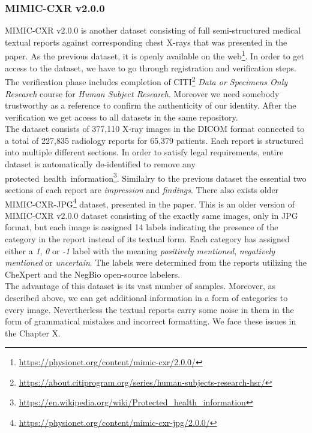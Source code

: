 \subsubsection{MIMIC-CXR v2.0.0}
MIMIC-CXR v2.0.0 is another dataset consisting of full semi-structured medical textual reports against corresponding chest X-rays that was presented in the \citet{cxr:johnson2019mimic} paper. As the previous dataset, it is openly available on the web\footnote[1]{\url{https://physionet.org/content/mimic-cxr/2.0.0/}}. In order to get access to the dataset, we have to go through registration and verification steps. The verification phase includes completion of CITI\footnote[1]{\url{https://about.citiprogram.org/series/human-subjects-research-hsr/}} \textit{Data or Specimens Only Research} course for \textit{Human Subject Research}. Moreover we need somebody trustworthy as a reference to confirm the authenticity of our identity. After the verification we get access to all datasets in the same repository.\\

The dataset consists of 377,110 X-ray images in the DICOM format connected to a total of 227,835 radiology reports for 65,379 patients. Each report is structured into multiple different sections. In order to satisfy legal requirements, entire dataset is automatically de-identified to remove any protected~health~information\footnote[1]{\url{https://en.wikipedia.org/wiki/Protected\_health\_information}}. Similalry to the previous dataset the essential two sections of each report are \textit{impression} and \textit{findings}. There also exists older MIMIC-CXR-JPG\footnote[1]{\url{https://physionet.org/content/mimic-cxr-jpg/2.0.0/}} dataset, presented in the \citet{cxr-jpg:johnson2019mimic} paper. This is an older version of MIMIC-CXR v2.0.0 dataset consisting of the exactly same images, only in JPG format, but each image is assigned 14 labels indicating the presence of the category in the report instead of its textual form. Each category has assigned either a \textit{1}, \textit{0} or \textit{-1} label with the meaning \textit{positively mentioned}, \textit{negatively mentioned} or \textit{uncertain}. The labels were determined from the reports utilizing the CheXpert\citep{irvin2019chexpert} and the NegBio\citep{peng2018negbio} open-source labelers.\\

The advantage of this dataset is its vast number of samples. Moreover, as described above, we can get additional information in a form of categories to every image. Nevertherless the textual reports carry some noise in them in the form of grammatical mistakes and incorrect formatting. We face these issues in the Chapter X. 

